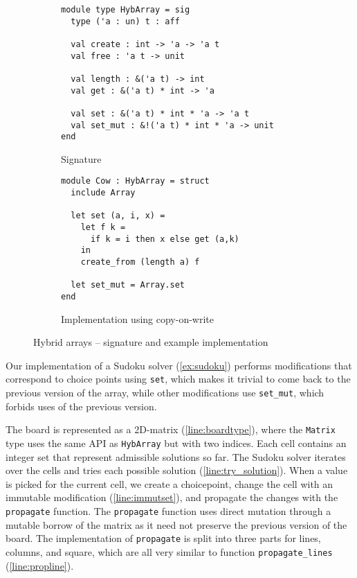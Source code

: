 \begin{figure}[tp]
  \centering
  \begin{subfigure}{0.48\linewidth}
\begin{lstlisting}
module type HybArray = sig
  type ('a : un) t : aff
  
  val create : int -> 'a -> 'a t
  val free : 'a t -> unit

  val length : &('a t) -> int
  val get : &('a t) * int -> 'a

  val set : &('a t) * int * 'a -> 'a t
  val set_mut : &!('a t) * int * 'a -> unit
end
\end{lstlisting}
    \caption{Signature}
    \label{sig:hybarray}
  \end{subfigure}\hfill
  \begin{subfigure}{0.5\linewidth}
\begin{lstlisting}
module Cow : HybArray = struct
  include Array

  let set (a, i, x) =
    let f k =
      if k = i then x else get (a,k)
    in
    create_from (length a) f
  
  let set_mut = Array.set
end
\end{lstlisting}
    \caption{Implementation using copy-on-write}
    \label{ex:cow}
  \end{subfigure}
  \caption{Hybrid arrays -- signature and example implementation}
\end{figure}

Our implementation of a Sudoku solver (\cref{ex:sudoku}) performs
modifications that correspond to choice points using \lstinline/set/,
which makes it trivial to come back to the previous version
of the array, while other modifications use \lstinline/set_mut/, which
forbids uses of the previous version.

The board is represented as a 2D-matrix (\cref{line:boardtype}), where
the \lstinline/Matrix/ type uses the same API as \lstinline/HybArray/
but with two indices. 
Each cell contains an integer set that represent admissible solutions so far.
The Sudoku solver iterates over the cells and tries each possible solution (\cref{line:try_solution}).
When a value is picked for the current cell, we create a choicepoint,
change the cell with an immutable modification (\cref{line:immutset}), and propagate
the changes with the \lstinline/propagate/ function.
The \lstinline/propagate/ function uses direct mutation through a
mutable borrow of the matrix as it need not preserve the previous
version of the board.  
The implementation of \lstinline/propagate/ is split into three parts
for lines, columns, and square, which are all very similar to function
\lstinline/propagate_lines/ (\cref{line:propline}). 

